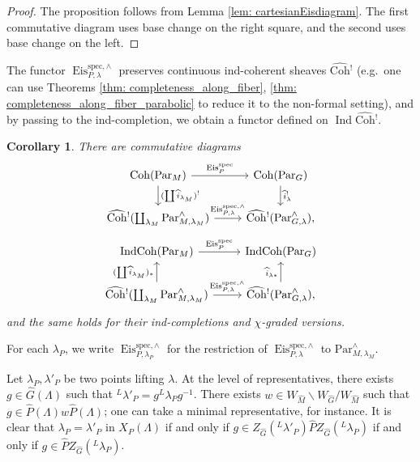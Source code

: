\documentclass{amsart}
\newtheorem{corollary}[theorem]{Corollary}
\theoremstyle{definition}
\theoremstyle{remark}
\numberwithin{equation}{section}
\DeclareMathOperator{\Ind}{Ind}
\newcommand{\spec}{\mathrm{spec}}
\newcommand{\wh}{\widehat}
\newcommand{\Par}{\mathrm{Par}}
\newcommand{\IndCoh}{\mathrm{IndCoh}}
\DeclareMathOperator{\Eis}{\mathrm{Eis}}
\newcommand{\Coh}{\mathrm{Coh}}
\begin{document}
\begin{proof}
The proposition follows from Lemma \ref{lem: cartesianEisdiagram}. The first commutative diagram uses base change on the right square, and the second uses base change on the left.
\end{proof}

The functor $\Eis^{\spec, \wedge}_{P,\lambda}$ preserves continuous ind-coherent sheaves $\wh{\Coh}{}^!$ (e.g.~one can use Theorems \ref{thm: completeness_along_fiber}, \ref{thm: completeness_along_fiber_parabolic} to reduce it to the non-formal setting), and by passing to the ind-completion, we obtain a functor defined on $\Ind\wh{\Coh}{}^!$. 
\begin{corollary}\label{cor: EisComparisonCompletedFiber}
There are commutative diagrams
\[
    \begin{tikzcd}
        \Coh(\Par_M) \arrow[d, "(\coprod\wh{i}_{\lambda_M})^!"] \arrow[r, "\Eis_P^\spec"] & \Coh(\Par_G) \arrow[d, "\wh{i}_\lambda^!"] \\    
        \wh{\Coh}{}^! (\coprod_{\lambda_M} \Par^{\wedge}_{M, \lambda_M}) \arrow[r, "\Eis_{P,\lambda}^{\spec,\wedge}"]  & \wh{\Coh}{}^!(\Par^{\wedge}_{G, \lambda}),
    \end{tikzcd} 
    \]
    \[
    \begin{tikzcd}
        \IndCoh(\Par_M) \arrow[r, "\Eis_P^\spec"] & \IndCoh(\Par_G) \\    
        \wh{\Coh}{}^! (\coprod_{\lambda_M} \Par^{\wedge}_{M, \lambda_M}) \arrow[u, "(\coprod\wh{i}_{\lambda_M})_*"]  \arrow[r, "\Eis_{P,\lambda}^{\spec,\wedge}"]  & \wh{\Coh}{}^!(\Par^{\wedge}_{G, \lambda}) \arrow[u, "\wh{i}_{\lambda*}"] ,
    \end{tikzcd}
    \]
and the same holds for their ind-completions and $\chi$-graded versions. 
\end{corollary}

For each $\lambda_P$, we write
$\Eis_{P, \lambda_P}^{\spec,\wedge}$ for the restriction of $\Eis^{\spec, \wedge}_{P,\lambda}$ to $\Par^{\wedge}_{M, \lambda_M}$. 

Let $\lambda_P, \lambda'_P$ be two points lifting $\lambda$. At the level of representatives, there exists $g\in \wh{G}(\Lambda)$ such that ${}^L\lambda'_P=g{}^L\lambda_P g^{-1}$. There exists $w\in W_{\wh M}\backslash W_{\wh G}/W_{\wh M}$ such that $g\in \wh{P}(\Lambda)w \wh P(\Lambda)$; one can take a minimal representative, for instance. It is clear that $\lambda_P=\lambda'_{P}$ in $X_P(\Lambda)$ if and only if $g\in Z_{\wh G}({}^L \lambda'_P)\wh P Z_{\wh G}({}^L \lambda_P)$ if and only if $g\in\wh P Z_{\wh G}({}^L \lambda_P) $. 
\end{document}
